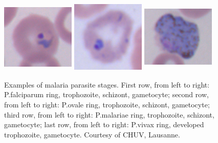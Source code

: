 \documentclass[sensors,review,submit,moreauthors,pdftex,10pt,a4paper]{mdpi}
\begin{document}
\begin{figure}[!t]
	\includegraphics[width=3.5cm, height=3.5cm]{img/vivax_1_ring}
	\includegraphics[width=3.5cm, height=3.5cm]{img/vivax_2c_trophozoiteDeveloped}
	\includegraphics[width=3.5cm, height=3.5cm]{img/vivax_4_gametocyte}
	\caption{\label{fig:malaria_stages}Examples of malaria parasite stages.
		First row, from left to right: P.falciparum ring, trophozoite, schizont, gametocyte;
		second row, from left to right: P.ovale ring, trophozoite, schizont, gametocyte;
		third row, from left to right: P.malariae ring, trophozoite, schizont, gametocyte;
		last row, from left to right: P.vivax ring, developed trophozoite, gametocyte.
		\newline Courtesy of CHUV, Lausanne.}
\end{figure}
\fi
\end{document}
